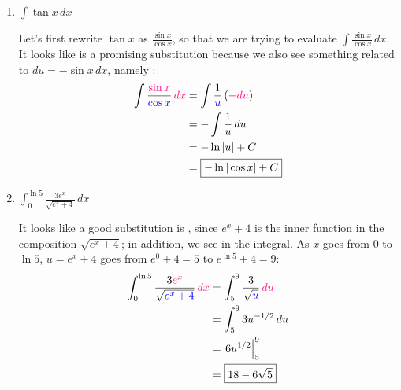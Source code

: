 \documentclass{article}
\begin{document}
\begin{enumerate}
\begin{enumerate}
    \item
      \begin{problem}[\vfill\newpage]
        $\displaystyle \int \tan x\,dx$
      \end{problem}

      \begin{solution}
        Let's first rewrite $\tan x$ as $\displaystyle \frac{\sin x}{\cos
        x}$, so that we are trying to evaluate $\displaystyle \int
      \frac{\sin x}{\cos x}\,dx$.  It looks like  is a
      promising substitution because we also see something related to
      $du = - \sin x\,dx$, namely :
      \begin{align*}
        \int \frac{\subd{\sin x}}{\sub{\cos x}}\,\subd{dx} &= \int
        \frac{1}{\sub{u}} \left( \subd{-du} \right) \\
        &= - \int \frac{1}{u}\,du \\
        &= - \ln |u| + C \\
        &= \boxed{- \ln |\cos x| + C}
      \end{align*}
      \end{solution}

    \item
      \begin{problem}[\vfill]
        $\displaystyle \int_0^{\ln 5} \frac{3e^x}{\sqrt{e^x +4}}\, dx$
      \end{problem}

      \begin{solution}
        It looks like a good substitution is , since $e^x
        + 4$ is the inner function in the composition $\sqrt{e^x + 4}$; in
        addition, we see  in the integral.  As $x$
        goes from $0$ to $\ln 5$, $u = e^x + 4$ goes from $e^0 + 4 = 5$ to
        $e^{\ln 5} + 4 = 9$:
        \begin{align*}
          \int_0^{\ln 5} \frac{3 \subd{e^x}}{\sqrt{\sub{e^x +4}}}\,
          \subd{dx} &= \int_5^9 \frac{3}{\sqrt{\sub{u}}}\,\subd{du} \\
          &= \int_5^9 3 u^{-1/2}\,du \\
          &= \left. 6 u^{1/2} \right|_5^9 \\
          &= \boxed{18 - 6 \sqrt{5}}
        \end{align*}
      \end{solution}

    \end{enumerate}      
  \probonly{}


\end{enumerate}
\end{document}
